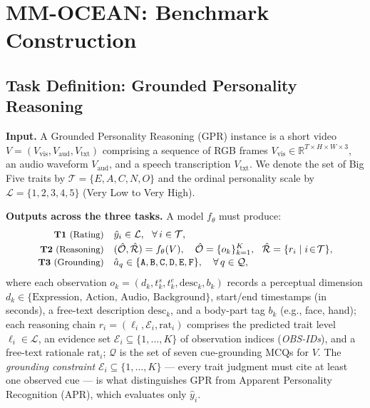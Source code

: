 \documentclass{article}
\newcommand{\taskname}{Grounded Personality Reasoning}
\newcommand{\taskabbr}{GPR}
\newcommand{\benchname}{MM-OCEAN}
\begin{document}
\section{\benchname{}: Benchmark Construction}
\label{sec:benchmark}

\subsection{Task Definition: \taskname{}}
\label{sec:task_def}

\noindent\textbf{Input.}  A Grounded Personality Reasoning (\taskabbr{}) instance is a short video $V = (V_{\text{vis}}, V_{\text{aud}}, V_{\text{txt}})$ comprising a sequence of RGB frames $V_{\text{vis}} \in \mathbb{R}^{T\times H\times W\times 3}$, an audio waveform $V_{\text{aud}}$, and a speech transcription $V_{\text{txt}}$. We denote the set of Big Five traits by $\mathcal{T} = \{E, A, C, N, O\}$ and the ordinal personality scale by $\mathcal{L} = \{1,2,3,4,5\}$ (Very Low to Very High).

\noindent\textbf{Outputs across the three tasks.} A model $f_\theta$ must produce:
\begin{align}
\text{\small\textbf{T1} (Rating)}\quad
& \hat{y}_i \in \mathcal{L},\ \ \forall\, i \in \mathcal{T}, \label{eq:t1}\\[-2pt]
\text{\small\textbf{T2} (Reasoning)}\quad
& (\hat{\mathcal{O}}, \hat{\mathcal{R}}) = f_\theta(V), \quad
  \hat{\mathcal{O}} = \{o_k\}_{k=1}^{K},\ \
  \hat{\mathcal{R}} = \{r_i \mid i\!\in\!\mathcal{T}\}, \label{eq:t2}\\[-2pt]
\text{\small\textbf{T3} (Grounding)}\quad
& \hat{a}_q \in \{\texttt{A},\texttt{B},\texttt{C},\texttt{D},\texttt{E},\texttt{F}\}, \quad \forall\, q \in \mathcal{Q}, \label{eq:t3}
\end{align}
where each observation $o_k\!=\!(d_k, t^s_k, t^e_k, \text{desc}_k, b_k)$ records a perceptual dimension $d_k\!\in\!\{\text{Expression, Action, Audio, Background}\}$, start/end timestamps (in seconds), a free-text description $\text{desc}_k$, and a body-part tag $b_k$ (e.g., face, hand); each reasoning chain $r_i\!=\!(\ell_i, \mathcal{E}_i, \text{rat}_i)$ comprises the predicted trait level $\ell_i\!\in\!\mathcal{L}$, an evidence set $\mathcal{E}_i\!\subseteq\!\{1,\dots,K\}$ of observation indices (\emph{OBS-IDs}), and a free-text rationale $\text{rat}_i$; $\mathcal{Q}$ is the set of seven cue-grounding MCQs for $V$. The \emph{grounding constraint} $\mathcal{E}_i\!\subseteq\!\{1,\dots,K\}$ --- every trait judgment must cite at least one observed cue --- is what distinguishes \taskabbr{} from Apparent Personality Recognition (APR), which evaluates only $\hat{y}_i$.
\end{document}
